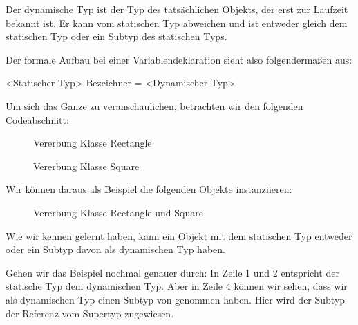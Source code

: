 \documentclass{tuda-pub}
\begin{document}
  \br

  Der dynamische Typ ist der Typ des tatsächlichen Objekts, der erst zur Laufzeit bekannt ist.
  Er kann vom statischen Typ abweichen und ist entweder gleich dem statischen Typ oder ein Subtyp
  des statischen Typs.

  \br

  Der formale Aufbau bei einer Variablendeklaration sieht also folgendermaßen aus:

  \begin{center}
  <Statischer Typ>
    Bezeichner = <Dynamischer Typ>
  \end{center}

  \clearpage
  Um sich das Ganze zu veranschaulichen, betrachten wir den folgenden Codeabschnitt:

  \begin{figure}[h]
    \centering
    
    \caption{Vererbung Klasse Rectangle}
    \label{fig:rec_overload}
  \end{figure}

  \begin{figure}[H]
    \centering
    
    \caption{Vererbung Klasse Square}
    \label{fig:sq_overload}
  \end{figure}

  \clearpage

  Wir können daraus als Beispiel die folgenden Objekte instanziieren:

  \begin{figure}[h]
    \centering
    
    \caption{Vererbung Klasse Rectangle und Square}
    \label{fig:Rectangle_and_Square_Example}
  \end{figure}

  Wie wir kennen gelernt haben, kann ein Objekt mit dem statischen Typ 
  entweder  oder ein Subtyp davon als dynamischen Typ haben.

  \br

  Gehen wir das Beispiel nochmal genauer durch: In Zeile 1 und 2 entspricht der statische Typ dem
  dynamischen Typ. Aber in Zeile 4 können wir sehen, dass wir als dynamischen Typ einen Subtyp
  von  genommen haben. Hier wird der Subtyp  der
  Referenz vom Supertyp  zugewiesen.
\end{document}
